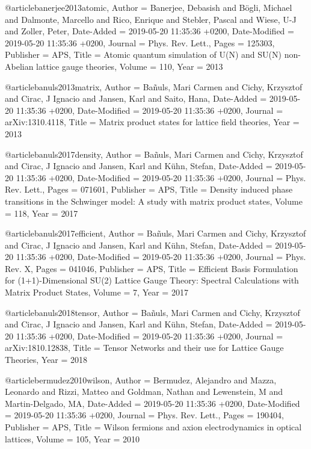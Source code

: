 \documentclass[epj,final]{svjour}
\begin{document}
@article{banerjee2013atomic,
	Author = {Banerjee, Debasish and B{\"o}gli, Michael and Dalmonte, Marcello and Rico, Enrique and Stebler, Pascal and Wiese, U-J and Zoller, Peter},
	Date-Added = {2019-05-20 11:35:36 +0200},
	Date-Modified = {2019-05-20 11:35:36 +0200},
	Journal = {Phys. Rev. Lett.},
	Pages = {125303},
	Publisher = {APS},
	Title = {Atomic quantum simulation of {U(N)} and {SU(N)} non-Abelian lattice gauge theories},
	Volume = {110},
	Year = {2013}}

@article{banuls2013matrix,
	Author = {Ba{\~n}uls, Mari Carmen and Cichy, Krzysztof and Cirac, J Ignacio and Jansen, Karl and Saito, Hana},
	Date-Added = {2019-05-20 11:35:36 +0200},
	Date-Modified = {2019-05-20 11:35:36 +0200},
	Journal = {arXiv:1310.4118},
	Title = {Matrix product states for lattice field theories},
	Year = {2013}}

@article{banuls2017density,
	Author = {Ba{\~n}uls, Mari Carmen and Cichy, Krzysztof and Cirac, J Ignacio and Jansen, Karl and K{\"u}hn, Stefan},
	Date-Added = {2019-05-20 11:35:36 +0200},
	Date-Modified = {2019-05-20 11:35:36 +0200},
	Journal = {Phys. Rev. Lett.},
	Pages = {071601},
	Publisher = {APS},
	Title = {Density induced phase transitions in the {Schwinger} model: A study with matrix product states},
	Volume = {118},
	Year = {2017}}

@article{banuls2017efficient,
	Author = {Ba{\~n}uls, Mari Carmen and Cichy, Krzysztof and Cirac, J Ignacio and Jansen, Karl and K{\"u}hn, Stefan},
	Date-Added = {2019-05-20 11:35:36 +0200},
	Date-Modified = {2019-05-20 11:35:36 +0200},
	Journal = {Phys. Rev. X},
	Pages = {041046},
	Publisher = {APS},
	Title = {Efficient Basis Formulation for (1+1)-Dimensional {SU(2)} Lattice Gauge Theory: Spectral Calculations with Matrix Product States},
	Volume = {7},
	Year = {2017}}

@article{banuls2018tensor,
	Author = {Ba{\~n}uls, Mari Carmen and Cichy, Krzysztof and Cirac, J Ignacio and Jansen, Karl and K{\"u}hn, Stefan},
	Date-Added = {2019-05-20 11:35:36 +0200},
	Date-Modified = {2019-05-20 11:35:36 +0200},
	Journal = {arXiv:1810.12838},
	Title = {Tensor Networks and their use for Lattice Gauge Theories},
	Year = {2018}}

@article{bermudez2010wilson,
	Author = {Bermudez, Alejandro and Mazza, Leonardo and Rizzi, Matteo and Goldman, Nathan and Lewenstein, M and Martin-Delgado, MA},
	Date-Added = {2019-05-20 11:35:36 +0200},
	Date-Modified = {2019-05-20 11:35:36 +0200},
	Journal = {Phys. Rev. Lett.},
	Pages = {190404},
	Publisher = {APS},
	Title = {Wilson fermions and axion electrodynamics in optical lattices},
	Volume = {105},
	Year = {2010}}
\end{document}

